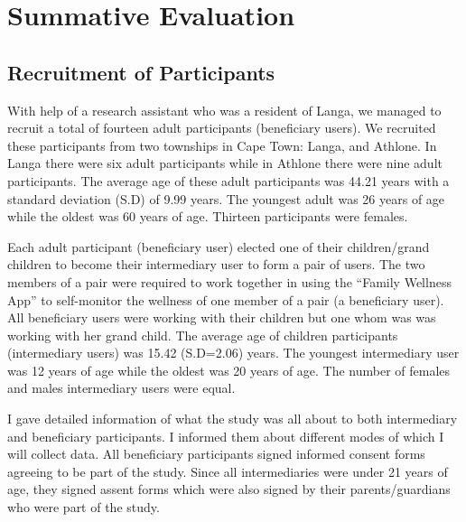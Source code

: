 
\chapter{Summative Evaluation} %

\label{summativeevalchapter} %


\section{Recruitment of Participants}
With help of a research assistant who was a resident of Langa,  we managed to recruit a total of fourteen adult participants (beneficiary users). We recruited these participants from two townships in Cape Town: Langa, and Athlone. In Langa there were six adult participants while in Athlone there were nine adult participants. The average age of these adult participants was 44.21 years with a standard deviation (S.D) of 9.99 years. The youngest adult was 26 years of age while the oldest was 60 years of age. Thirteen participants were females. 

Each adult participant (beneficiary user) elected one of their children/grand children to become their intermediary user to form a pair of users. The two members of a pair were required to work together in using the ``Family Wellness App'' to self-monitor the wellness of one member of a pair (a beneficiary user). All beneficiary users were working with their children but one whom was was working with her grand child.  The average age of children participants (intermediary users) was 15.42 (S.D=2.06) years. The youngest intermediary user was 12 years of age while the oldest was 20 years of age. The number of females and males intermediary users were equal. 

I gave detailed information of what the study was all about to both intermediary and beneficiary participants. I informed them about different modes of which I will collect data. All beneficiary participants signed informed consent forms agreeing to be part of the study. Since all intermediaries were under 21 years of age, they signed assent forms which were also signed by their parents/guardians who were part of the study.

